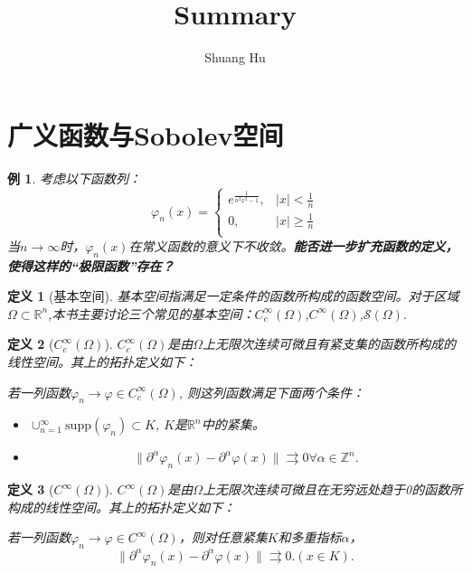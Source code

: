 \documentclass[a4paper]{ctexart}
\title{Summary}
\author{Shuang Hu}
\newtheorem{Definition}{\hspace{2em}定义}[section]
\newtheorem{Example}{\hspace{2em}例}[section]
\newcommand{\supp}{\text{supp}}
\begin{document}
\maketitle
\section{广义函数与Sobolev空间}
\begin{Example}
    考虑以下函数列：
    \begin{equation}
        \varphi_{n}(x)=
        \left\{
            \begin{aligned}
            e^{\frac{1}{n^{2}x^{2}-1}},&|x|<\frac{1}{n}\\
            0,&|x|\ge\frac{1}{n}\\
            \end{aligned}
        \right.
    \end{equation}
    当$n\rightarrow\infty$时，$\varphi_{n}(x)$在常义函数的意义下不收敛。\textbf{能否进一步扩充函数的定义，使得这样的“极限函数”存在？}
\end{Example}
\begin{Definition}[基本空间]
基本空间指满足一定条件的函数所构成的函数空间。对于区域$\Omega\subset\mathbb{R}^{n}$,本书主要讨论三个常见的基本空间：$C_{c}^{\infty}(\Omega)$,$C^{\infty}(\Omega)$,$\mathscr{S}(\Omega)$.
\end{Definition}
\begin{Definition}[$C_{c}^{\infty}(\Omega)$]
    $C_{c}^{\infty}(\Omega)$是由$\Omega$上无限次连续可微且有紧支集的函数所构成的线性空间。其上的拓扑定义如下：

    若一列函数$\varphi_{n}\rightarrow\varphi\in C_{c}^{\infty}(\Omega)$, 则这列函数满足下面两个条件：
    \begin{itemize}
        \item $\cup_{n=1}^{\infty}\supp(\varphi_{n})\subset K$, $K$是$\mathbb{R}^{n}$中的紧集。
        \item \begin{equation}
            \|\partial^{\alpha}\varphi_{n}(x)-\partial^{\alpha}\varphi(x)\| \rightrightarrows0 \forall \alpha\in\mathbb{Z}^{n}.
        \end{equation}
    \end{itemize}
\end{Definition}
\begin{Definition}[$C^{\infty}(\Omega)$]
    $C^{\infty}(\Omega)$是由$\Omega$上无限次连续可微且在无穷远处趋于0的函数所构成的线性空间。其上的拓扑定义如下：
    
    若一列函数$\varphi_{n}\rightarrow\varphi\in C^{\infty}(\Omega)$，则对任意紧集$K$和多重指标$\alpha$，
    \begin{equation}
        \|\partial^{\alpha}\varphi_{n}(x)-\partial^{\alpha}\varphi(x)\| \rightrightarrows0.(x\in K).
    \end{equation}
\end{Definition}
\end{document}
